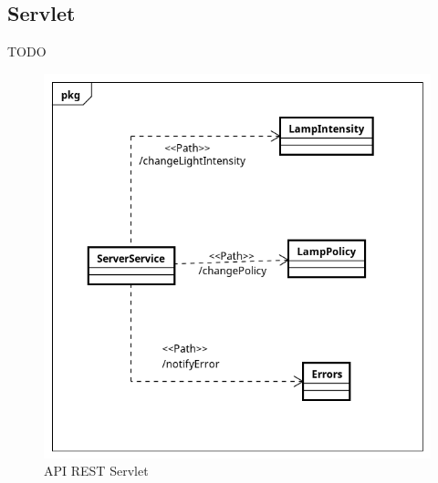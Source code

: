 \subsection{Servlet}
TODO
\iffalse
\begin{figure}[ht]
	\centering
	\includegraphics[scale=.8]{figure/Class_Diagram_Server_REST.png}
	\caption{API REST Servlet \label{API REST SERVLET}}
\end{figure}
